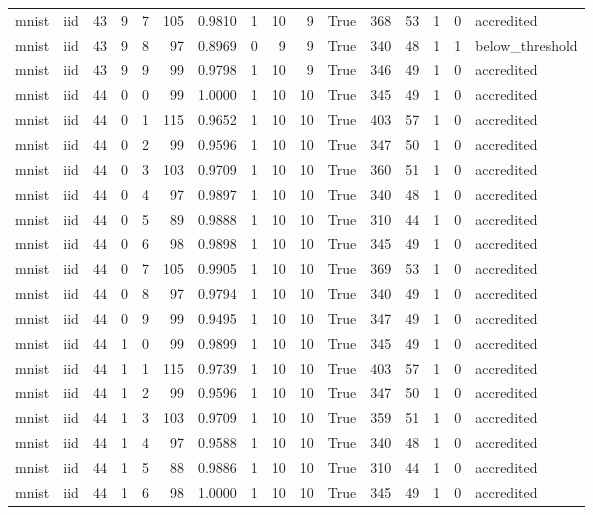 \begin{tabular}{llrrrrrrrrrrrrrl}
mnist & iid & 43 & 9 & 7 & 105 & 0.9810 & 1 & 10 & 9 & True & 368 & 53 & 1 & 0 & accredited \\
mnist & iid & 43 & 9 & 8 & 97 & 0.8969 & 0 & 9 & 9 & True & 340 & 48 & 1 & 1 & below\_threshold \\
mnist & iid & 43 & 9 & 9 & 99 & 0.9798 & 1 & 10 & 9 & True & 346 & 49 & 1 & 0 & accredited \\
mnist & iid & 44 & 0 & 0 & 99 & 1.0000 & 1 & 10 & 10 & True & 345 & 49 & 1 & 0 & accredited \\
mnist & iid & 44 & 0 & 1 & 115 & 0.9652 & 1 & 10 & 10 & True & 403 & 57 & 1 & 0 & accredited \\
mnist & iid & 44 & 0 & 2 & 99 & 0.9596 & 1 & 10 & 10 & True & 347 & 50 & 1 & 0 & accredited \\
mnist & iid & 44 & 0 & 3 & 103 & 0.9709 & 1 & 10 & 10 & True & 360 & 51 & 1 & 0 & accredited \\
mnist & iid & 44 & 0 & 4 & 97 & 0.9897 & 1 & 10 & 10 & True & 340 & 48 & 1 & 0 & accredited \\
mnist & iid & 44 & 0 & 5 & 89 & 0.9888 & 1 & 10 & 10 & True & 310 & 44 & 1 & 0 & accredited \\
mnist & iid & 44 & 0 & 6 & 98 & 0.9898 & 1 & 10 & 10 & True & 345 & 49 & 1 & 0 & accredited \\
mnist & iid & 44 & 0 & 7 & 105 & 0.9905 & 1 & 10 & 10 & True & 369 & 53 & 1 & 0 & accredited \\
mnist & iid & 44 & 0 & 8 & 97 & 0.9794 & 1 & 10 & 10 & True & 340 & 49 & 1 & 0 & accredited \\
mnist & iid & 44 & 0 & 9 & 99 & 0.9495 & 1 & 10 & 10 & True & 347 & 49 & 1 & 0 & accredited \\
mnist & iid & 44 & 1 & 0 & 99 & 0.9899 & 1 & 10 & 10 & True & 345 & 49 & 1 & 0 & accredited \\
mnist & iid & 44 & 1 & 1 & 115 & 0.9739 & 1 & 10 & 10 & True & 403 & 57 & 1 & 0 & accredited \\
mnist & iid & 44 & 1 & 2 & 99 & 0.9596 & 1 & 10 & 10 & True & 347 & 50 & 1 & 0 & accredited \\
mnist & iid & 44 & 1 & 3 & 103 & 0.9709 & 1 & 10 & 10 & True & 359 & 51 & 1 & 0 & accredited \\
mnist & iid & 44 & 1 & 4 & 97 & 0.9588 & 1 & 10 & 10 & True & 340 & 48 & 1 & 0 & accredited \\
mnist & iid & 44 & 1 & 5 & 88 & 0.9886 & 1 & 10 & 10 & True & 310 & 44 & 1 & 0 & accredited \\
mnist & iid & 44 & 1 & 6 & 98 & 1.0000 & 1 & 10 & 10 & True & 345 & 49 & 1 & 0 & accredited \\

\end{tabular}
